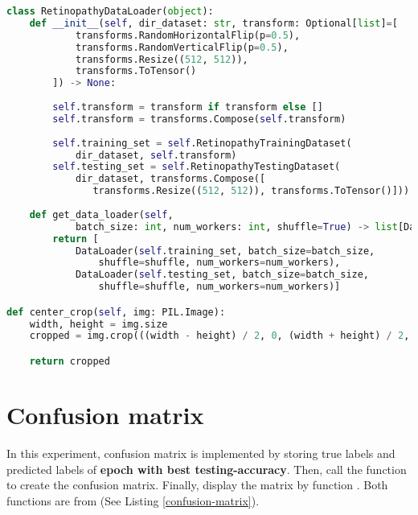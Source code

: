 \begin{lstlisting}[language=Python, caption={Python code of \textcolor{blue}{\textbf{DataLoader}} (some code is omitted).}, label={dataloader}]
class RetinopathyDataLoader(object):
    def __init__(self, dir_dataset: str, transform: Optional[list]=[
            transforms.RandomHorizontalFlip(p=0.5),
            transforms.RandomVerticalFlip(p=0.5), 
            transforms.Resize((512, 512)), 
            transforms.ToTensor()
        ]) -> None:
        
        self.transform = transform if transform else []
        self.transform = transforms.Compose(self.transform)
        
        self.training_set = self.RetinopathyTrainingDataset(
            dir_dataset, self.transform)
        self.testing_set = self.RetinopathyTestingDataset(
            dir_dataset, transforms.Compose([
               transforms.Resize((512, 512)), transforms.ToTensor()]))
        
    def get_data_loader(self, 
            batch_size: int, num_workers: int, shuffle=True) -> list[DataLoader, DataLoader]:
        return [
            DataLoader(self.training_set, batch_size=batch_size, 
                shuffle=shuffle, num_workers=num_workers), 
            DataLoader(self.testing_set, batch_size=batch_size, 
                shuffle=shuffle, num_workers=num_workers)]

def center_crop(self, img: PIL.Image): 
    width, height = img.size
    cropped = img.crop(((width - height) / 2, 0, (width + height) / 2, height))

    return cropped\end{lstlisting}

\section{Confusion matrix}
\indent
    In this experiment, confusion matrix is implemented by storing true labels and predicted labels of \textbf{epoch with best testing-accuracy}. Then, 
    call the function  to create the confusion matrix. Finally, display the matrix by function . 
    Both functions are from  (See Listing \ref{confusion-matrix}).

